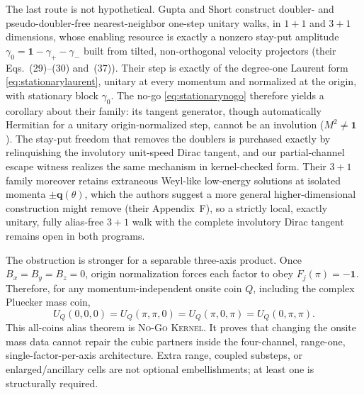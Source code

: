 \documentclass[11pt]{article}
\newcommand{\Kernel}{\textcolor{kernelcolor}{\textsc{Kernel}}}
\newcommand{\NoGo}{\textsc{No-Go}}
\newcommand{\id}{\mathbf{1}}
\begin{document}
The last route is not hypothetical.  Gupta and Short
\cite{GuptaShortDoubling} construct doubler- and pseudo-doubler-free
nearest-neighbor one-step unitary walks, in $1+1$ and $3+1$ dimensions, whose
enabling resource is exactly a nonzero stay-put amplitude
$\gamma_0=\id-\gamma_+-\gamma_-$ built from tilted, non-orthogonal velocity
projectors (their Eqs.~(29)--(30) and~(37)).  Their step is exactly of the
degree-one Laurent form \eqref{eq:stationarylaurent}, unitary at every
momentum and normalized at the origin, with stationary block $\gamma_0$.
The no-go \eqref{eq:stationarynogo} therefore yields a corollary about
their family: its tangent generator, though automatically Hermitian for a
unitary origin-normalized step, cannot be an involution ($M^2
\neq\id$).
The stay-put freedom that removes the doublers is purchased
exactly by relinquishing the involutory unit-speed Dirac tangent, and our
partial-channel escape witness realizes the same mechanism in kernel-checked
form.  Their $3+1$ family moreover retains extraneous Weyl-like low-energy
solutions at isolated momenta $\pm\mathbf q(\theta)$, which the authors
suggest a more general higher-dimensional construction might remove (their
Appendix~F), so a strictly local, exactly unitary, fully alias-free $3+1$
walk with the complete involutory Dirac tangent remains open in both
programs.

The obstruction is stronger for a separable three-axis product.  Once
$B_x=B_y=B_z=0$, origin normalization forces each factor to obey
$F_j(\pi)=-\id$.  Therefore, for any momentum-independent onsite coin $Q$,
including the complex Pluecker mass coin,
\begin{equation}\label{eq:genericcorneralias}
 U_Q(0,0,0)=U_Q(\pi,\pi,0)=U_Q(\pi,0,\pi)=U_Q(0,\pi,\pi).
\end{equation}
This all-coins alias theorem is \NoGo{} \Kernel{}.  It proves that changing
the onsite mass data cannot repair the cubic partners inside the
four-channel, range-one, single-factor-per-axis architecture.  Extra range,
coupled substeps, or enlarged/ancillary cells are not optional embellishments;
at least one is structurally required.
\end{document}

